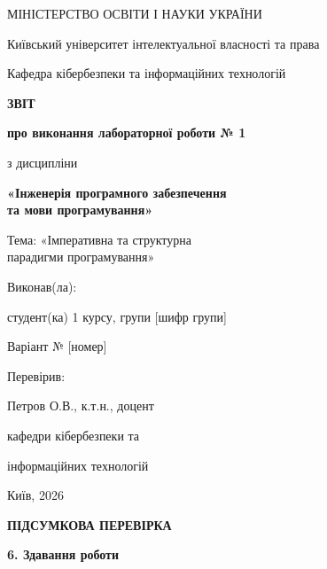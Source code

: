 \documentclass[12pt,a4paper]{article}
\newcommand{\eyebrow}[1]{%
  {\color{accent}\fontsize{7.5}{9}\selectfont\bfseries\MakeUppercase{#1}\par}\vspace{5pt}}
\newcommand{\pagetitle}[1]{%
  {\fontsize{18}{21}\selectfont\bfseries #1\par}\vspace{7pt}}
\begin{document}
\thispagestyle{empty}
\begin{center}
{\fontsize{10}{13}\selectfont
МІНІСТЕРСТВО ОСВІТИ І НАУКИ УКРАЇНИ\par
\vspace{8pt}
Київський університет інтелектуальної власності та права\par
\vspace{8pt}
Кафедра кібербезпеки та інформаційних технологій\par}

\vspace{38mm}

{\fontsize{16}{19}\selectfont\bfseries ЗВІТ\par}
\vspace{4pt}
{\fontsize{13}{16}\selectfont\bfseries
про виконання лабораторної роботи № 1\par}

\vspace{13mm}

з дисципліни\par
{\bfseries «Інженерія програмного забезпечення\\
та мови програмування»\par}

\vspace{10mm}

Тема: «Імперативна та структурна\\
парадигми програмування»

\vspace{20mm}

\begin{minipage}{0.47\textwidth}
\raggedright
Виконав(ла):\par
студент(ка) 1 курсу, групи [шифр групи]\par
[Прізвище, ім’я, по батькові]\par
Варіант № [номер]\par

\vspace{10pt}
Перевірив:\par
Петров О.В., к.т.н., доцент\par
кафедри кібербезпеки та\par
інформаційних технологій
\end{minipage}

\vfill

Київ, 2026
\end{center}

\newpage

\eyebrow{Підсумкова перевірка}
\pagetitle{6. Здавання роботи}
\end{document}
